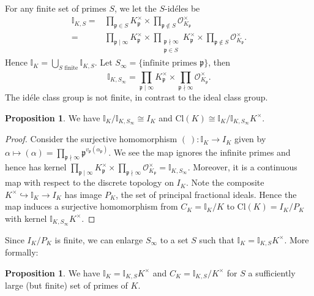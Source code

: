 \documentclass{article}
\theoremstyle{definition}
\newtheorem{prop}[theorem]{Proposition}
\begin{document}
For any finite set of primes $S$, we let the $S$-id\'eles be 
\begin{align*}
    \mathbb{I}_{K,S} =& \prod_{\mathfrak{p} \in S}^{} K_{\mathfrak{p}}^\times \times \prod_{\mathfrak{p} \not\in S}^{} \mathcal{O}_{K_{\mathfrak{p}}}^\times \\
    =& \prod_{\mathfrak{p} \mid \infty}^{} K_{\mathfrak{p}}^\times \times \prod_{\substack{\mathfrak{p} \nmid \infty\\ \mathfrak{p} \in S}}^{} K_{\mathfrak{p}}^\times \times \prod_{\mathfrak{p} \not\in S}^{} \mathcal{O}_{K_{\mathfrak{p}}}^\times. 
\end{align*}
Hence $\mathbb{I}_K = \bigcup_{S \text{ finite}} \mathbb{I}_{K,S}$. Let $S_{\infty} = \{\text{infinite primes }\mathfrak{p}\}$, then 
\[
\mathbb{I}_{K,S_{\infty}} = \prod_{\mathfrak{p} \mid  \infty}^{} K_{\mathfrak{p}}^\times \times \prod_{\mathfrak{p} \nmid \infty}^{} \mathcal{O}_{K_{\mathfrak{p}}}^\times.
\]
The id\'ele class group is not finite, in contrast to the ideal class group.
\begin{prop}\label{prop4.8}
    We have $\mathbb{I}_K/\mathbb{I}_{K,S_{\infty}} \cong I_K$ and $\text{Cl}(K) \cong \mathbb{I}_K/\mathbb{I}_{K,S_{\infty}}K^\times$.
\end{prop}
\begin{proof}
    Consider the surjective homomorphism $(~): \mathbb{I}_K \to I_K$ given by $\alpha \mapsto (\alpha) = \prod_{\mathfrak{p} \nmid \infty}^{} \mathfrak{p}^{v_{\mathfrak{p}}(\alpha_{\mathfrak{p}})}$. We see the map ignores the infinite primes and hence has kernel $\prod_{\mathfrak{p} \mid \infty}^{} K_{\mathfrak{p}}^\times \times \prod_{\mathfrak{p} \nmid \infty}^{} \mathcal{O}_{K_{\mathfrak{p}}}^\times = \mathbb{I}_{K,S_{\infty}}$. Moreover, it is a continuous map with respect to the discrete topology on $I_K$. Note the composite $K^\times \hookrightarrow \mathbb{I}_K \to I_K$ has image $P_K$, the set of principal fractional ideals. Hence the map induces a surjective homomorphism from $C_K = \mathbb{I}_K/K$ to $\text{Cl}(K) = I_K/P_K$ with kernel $\mathbb{I}_{K,S_{\infty}}K^\times$.
\end{proof}
Since $I_K/P_K$ is finite, we can enlarge $S_{\infty}$ to a set $S$ such that $\mathbb{I}_K = \mathbb{I}_{K,S}K^\times$. More formally:
\begin{prop}\label{prop4.9}
    We have $\mathbb{I}_K = \mathbb{I}_{K,S}K^\times$ and $C_K = \mathbb{I}_{K,S}/K^\times$ for $S$ a sufficiently large (but finite) set of primes of $K$.  
\end{prop}
\end{document}
